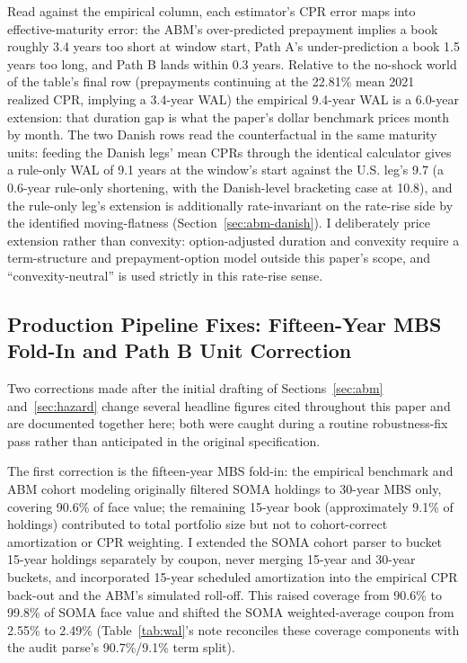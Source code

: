 \documentclass[12pt]{article}
\begin{document}
Read against the empirical column, each estimator's CPR error maps into effective-maturity error: the ABM's over-predicted prepayment implies a book roughly 3.4 years too short at window start, Path A's under-prediction a book 1.5 years too long, and Path B lands within 0.3 years. Relative to the no-shock world of the table's final row (prepayments continuing at the 22.81\% mean 2021 realized CPR, implying a 3.4-year WAL) the empirical 9.4-year WAL is a 6.0-year extension: that duration gap is what the paper's dollar benchmark prices month by month. The two Danish rows read the counterfactual in the same maturity units: feeding the Danish legs' mean CPRs through the identical calculator gives a rule-only WAL of 9.1 years at the window's start against the U.S. leg's 9.7 (a 0.6-year rule-only shortening, with the Danish-level bracketing case at 10.8), and the rule-only leg's extension is additionally rate-invariant on the rate-rise side by the identified moving-flatness (Section~\ref{sec:abm-danish}). I deliberately price extension rather than convexity: option-adjusted duration and convexity require a term-structure and prepayment-option model outside this paper's scope, and ``convexity-neutral'' is used strictly in this rate-rise sense.

\subsection{Production Pipeline Fixes: Fifteen-Year MBS Fold-In and Path B Unit Correction}\label{sec:robustness-pipeline}

Two corrections made after the initial drafting of Sections~\ref{sec:abm} and~\ref{sec:hazard} change several headline figures cited throughout this paper and are documented together here; both were caught during a routine robustness-fix pass rather than anticipated in the original specification.

The first correction is the fifteen-year MBS fold-in: the empirical benchmark and ABM cohort modeling originally filtered SOMA holdings to 30-year MBS only, covering 90.6\% of face value; the remaining 15-year book (approximately 9.1\% of holdings) contributed to total portfolio size but not to cohort-correct amortization or CPR weighting. I extended the SOMA cohort parser to bucket 15-year holdings separately by coupon, never merging 15-year and 30-year buckets, and incorporated 15-year scheduled amortization into the empirical CPR back-out and the ABM's simulated roll-off. This raised coverage from 90.6\% to 99.8\% of SOMA face value and shifted the SOMA weighted-average coupon from 2.55\% to 2.49\% (Table~\ref{tab:wal}'s note reconciles these coverage components with the audit parse's 90.7\%/9.1\% term split).
\end{document}
